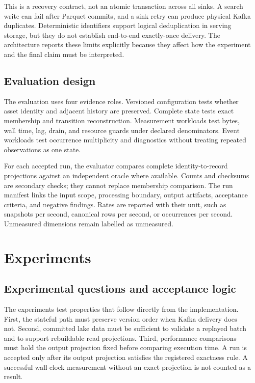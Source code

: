 \documentclass[a4paper,11pt]{article}
\begin{document}
This is a recovery contract, not an atomic transaction across all sinks. A search write can fail after Parquet commits, and a sink retry can produce physical Kafka duplicates. Deterministic identifiers support logical deduplication in serving storage, but they do not establish end-to-end exactly-once delivery. The architecture reports these limits explicitly because they affect how the experiment and the final claim must be interpreted.

\subsection{Evaluation design}
The evaluation uses four evidence roles. Versioned configuration tests whether asset identity and adjacent history are preserved. Complete state tests exact membership and transition reconstruction. Measurement workloads test bytes, wall time, lag, drain, and resource guards under declared denominators. Event workloads test occurrence multiplicity and diagnostics without treating repeated observations as one state.

For each accepted run, the evaluator compares complete identity-to-record projections against an independent oracle where available. Counts and checksums are secondary checks; they cannot replace membership comparison. The run manifest links the input scope, processing boundary, output artifacts, acceptance criteria, and negative findings. Rates are reported with their unit, such as snapshots per second, canonical rows per second, or occurrences per second. Unmeasured dimensions remain labelled as unmeasured.
\section{Experiments}

\subsection{Experimental questions and acceptance logic}
The experiments test properties that follow directly from the implementation. First, the stateful path must preserve version order when Kafka delivery does not. Second, committed lake data must be sufficient to validate a replayed batch and to support rebuildable read projections. Third, performance comparisons must hold the output projection fixed before comparing execution time. A run is accepted only after its output projection satisfies the registered exactness rule. A successful wall-clock measurement without an exact projection is not counted as a result.
\end{document}
